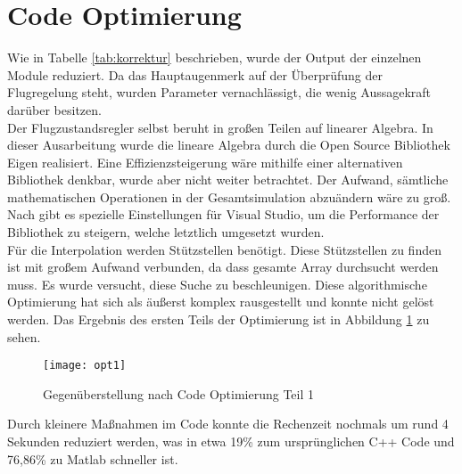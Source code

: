 \section{Code Optimierung}
Wie in Tabelle \ref{tab:korrektur} beschrieben, wurde der Output der einzelnen Module reduziert. Da das Hauptaugenmerk auf der Überprüfung der Flugregelung steht, wurden Parameter vernachlässigt, die wenig Aussagekraft darüber besitzen.\\ Der Flugzustandsregler selbst beruht in großen Teilen auf linearer Algebra. In dieser Ausarbeitung wurde die lineare Algebra durch die Open Source Bibliothek Eigen realisiert. Eine Effizienzsteigerung wäre mithilfe einer alternativen Bibliothek denkbar, wurde aber nicht weiter betrachtet. Der Aufwand, sämtliche mathematischen Operationen in der Gesamtsimulation abzuändern wäre zu groß. Nach \cite{TuxFamily.2018} gibt es spezielle Einstellungen für Visual Studio, um die Performance der Bibliothek zu steigern, welche letztlich umgesetzt wurden. \\  Für die Interpolation werden Stützstellen benötigt. Diese Stützstellen zu finden ist mit großem Aufwand verbunden, da dass gesamte Array durchsucht werden muss. Es wurde versucht, diese Suche zu beschleunigen. Diese algorithmische Optimierung hat sich als äußerst komplex rausgestellt und konnte nicht gelöst werden. Das Ergebnis des ersten Teils der Optimierung ist in Abbildung \ref{fig:opt1} zu sehen.\newpage
\begin{figure}[h]
	\centering
	\texttt{[image: opt1]}
	\caption{Gegenüberstellung nach Code Optimierung Teil 1}
	\label{fig:opt1}
\end{figure}\noindent
Durch kleinere Maßnahmen im Code konnte die Rechenzeit nochmals um rund 4 Sekunden reduziert werden, was in etwa 19\% zum ursprünglichen C++ Code und 76,86\% zu Matlab schneller ist.

